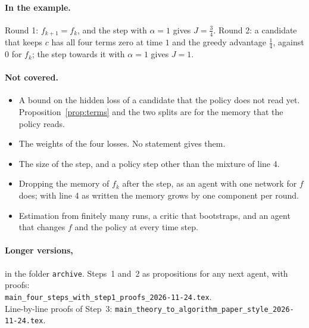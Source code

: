 \documentclass[11pt]{article}
\theoremstyle{definition}
\begin{document}
\paragraph{In the example.} Round 1: $f_{k+1}=f_k$, and the step with $\alpha=1$ gives $J=\tfrac34$. Round 2: a candidate that keeps $c$ has all four terms zero at time $1$ and the greedy advantage $\tfrac14$, against $0$ for $f_k$; the step towards it with $\alpha=1$ gives $J=1$.

\paragraph{Not covered.}
\begin{itemize}\setlength{\itemsep}{0pt}
\item A bound on the hidden loss of a candidate that the policy does not read yet. Proposition~\ref{prop:terms} and the two splits are for the memory that the policy reads.
\item The weights of the four losses. No statement gives them.
\item The size of the step, and a policy step other than the mixture of line 4.
\item Dropping the memory of $f_k$ after the step, as an agent with one network for $f$ does; with line 4 as written the memory grows by one component per round.
\item Estimation from finitely many runs, a critic that bootstraps, and an agent that changes $f$ and the policy at every time step.
\end{itemize}

\paragraph{Longer versions,} in the folder \texttt{archive}. Steps~1 and~2 as propositions for any next agent, with proofs:\\ {\small\texttt{main\_four\_steps\_with\_step1\_proofs\_2026-11-24.tex}}.\\ Line-by-line proofs of Step~3: {\small\texttt{main\_theory\_to\_algorithm\_paper\_style\_2026-11-24.tex}}.
\end{document}
